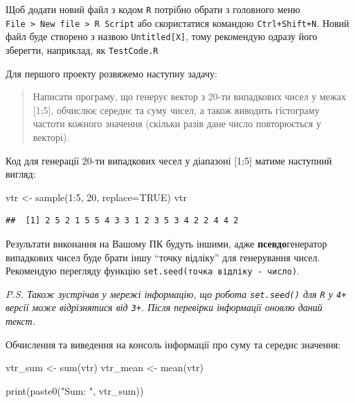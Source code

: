 \documentclass[
]{book}
\newenvironment{Shaded}{\begin{snugshade}}{\end{snugshade}}
\newcommand{\AttributeTok}[1]{\textcolor[rgb]{0.77,0.63,0.00}{#1}}
\newcommand{\ConstantTok}[1]{\textcolor[rgb]{0.00,0.00,0.00}{#1}}
\newcommand{\DecValTok}[1]{\textcolor[rgb]{0.00,0.00,0.81}{#1}}
\newcommand{\FunctionTok}[1]{\textcolor[rgb]{0.00,0.00,0.00}{#1}}
\newcommand{\NormalTok}[1]{#1}
\newcommand{\OtherTok}[1]{\textcolor[rgb]{0.56,0.35,0.01}{#1}}
\newcommand{\SpecialCharTok}[1]{\textcolor[rgb]{0.00,0.00,0.00}{#1}}
\newcommand{\StringTok}[1]{\textcolor[rgb]{0.31,0.60,0.02}{#1}}
\begin{document}
Щоб додати новий файл з кодом \texttt{R} потрібно обрати з головного меню \texttt{File\ \textgreater{}\ New\ file\ \textgreater{}\ R\ Script} або скористатися командою \texttt{Ctrl+Shift+N}. Новий файл буде створено з назвою \texttt{Untitled{[}X{]}}, тому рекомендую одразу його зберегти, наприклад, як \texttt{TestCode.R}

Для першого проекту розвяжемо наступну задачу:

\begin{quote}
Написати програму, що генерує вектор з 20-ти випадкових чисел у межах {[}1;5{]}, обчислює середнє та суму чисел, а також виводить гістограму частоти кожного значення (скільки разів дане число повторюється у векторі).
\end{quote}

Код для генерації 20-ти випадкових чесел у діапазоні {[}1;5{]} матиме наступний вигляд:

\begin{Shaded}
\begin{Highlighting}[]
\NormalTok{vtr }\OtherTok{\textless{}{-}} \FunctionTok{sample}\NormalTok{(}\DecValTok{1}\SpecialCharTok{:}\DecValTok{5}\NormalTok{, }\DecValTok{20}\NormalTok{, }\AttributeTok{replace=}\ConstantTok{TRUE}\NormalTok{)}
\NormalTok{vtr}
\end{Highlighting}
\end{Shaded}

\begin{verbatim}
##  [1] 2 5 2 1 5 5 4 3 3 1 2 3 5 3 4 2 2 4 4 2
\end{verbatim}

Результати виконання на Вашому ПК будуть іншими, адже \textbf{псевдо}генератор випадкових чисел буде брати іншу ``точку відліку'' для генерування чисел. Рекомендую перегляду функцію \texttt{set.seed(точка\ відліку\ -\ число)}.

\emph{P.S. Також зустрічав у мережі інформацію, що робота \texttt{set.seed()} для \texttt{R} у \texttt{4+} версії може відрізнятися від \texttt{3+}. Після перевірки інформації оновлю даний текст.}

Обчислення та виведення на консоль інформації про суму та середнє значення:

\begin{Shaded}
\begin{Highlighting}[]
\NormalTok{vtr\_sum }\OtherTok{\textless{}{-}} \FunctionTok{sum}\NormalTok{(vtr)}
\NormalTok{vtr\_mean }\OtherTok{\textless{}{-}} \FunctionTok{mean}\NormalTok{(vtr)}

\FunctionTok{print}\NormalTok{(}\FunctionTok{paste0}\NormalTok{(}\StringTok{"Sum: "}\NormalTok{, vtr\_sum))}
\end{Highlighting}
\end{Shaded}
\end{document}
